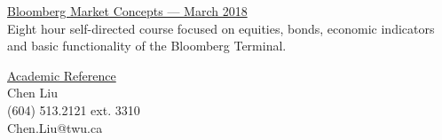 \documentclass{article}
\begin{document}
\begin{minipage}[t]{0.6\textwidth}
\vspace{7pt}
\large\underline{Bloomberg Market Concepts --- March 2018}\\

\normalsize Eight hour self-directed course focused on equities, bonds, economic
indicators and basic functionality of the Bloomberg Terminal.
\vspace{10pt}

\end{minipage}

\vspace{20pt}
\begin{center}
  \large\underline{Academic Reference}\\
  Chen Liu\\
  (604) 513.2121 ext. 3310\\
  Chen.Liu@twu.ca
\end{center}
\end{document}
